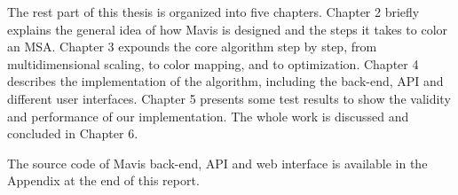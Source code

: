 The rest part of this thesis is organized into five chapters. Chapter 2 briefly explains the general idea of how Mavis is designed and the steps it takes to color an MSA. Chapter 3 expounds the core algorithm step by step, from multidimensional scaling, to color mapping, and to optimization. Chapter 4 describes the implementation of the algorithm, including the back-end, API and different user interfaces. Chapter 5 presents some test results to show the validity and performance of our implementation. The whole work is discussed and concluded in Chapter 6.

The source code of Mavis back-end, API and web interface is available in the Appendix at the end of this report.

